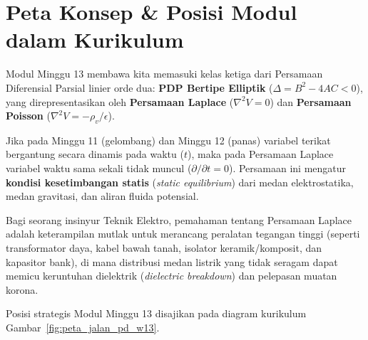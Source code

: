 \documentclass[11pt,a4paper]{article}
\theoremstyle{definition}
\begin{document}
\vspace{0.3cm}
\tableofcontents
\vspace{0.5cm}

\newpage

\section{Peta Konsep \& Posisi Modul dalam Kurikulum}

Modul Minggu 13 membawa kita memasuki kelas ketiga dari Persamaan Diferensial Parsial linier orde dua: \textbf{PDP Bertipe Elliptik} ($\Delta = B^2 - 4AC < 0$), yang direpresentasikan oleh \textbf{Persamaan Laplace} ($\nabla^2 V = 0$) dan \textbf{Persamaan Poisson} ($\nabla^2 V = -\rho_v/\epsilon$). 

Jika pada Minggu 11 (gelombang) dan Minggu 12 (panas) variabel terikat bergantung secara dinamis pada waktu ($t$), maka pada Persamaan Laplace variabel waktu sama sekali tidak muncul ($\partial/\partial t = 0$). Persamaan ini mengatur \textbf{kondisi kesetimbangan statis} (\textit{static equilibrium}) dari medan elektrostatika, medan gravitasi, dan aliran fluida potensial.

Bagi seorang insinyur Teknik Elektro, pemahaman tentang Persamaan Laplace adalah keterampilan mutlak untuk merancang peralatan tegangan tinggi (seperti transformator daya, kabel bawah tanah, isolator keramik/komposit, dan kapasitor bank), di mana distribusi medan listrik yang tidak seragam dapat memicu keruntuhan dielektrik (\textit{dielectric breakdown}) dan pelepasan muatan korona.

Posisi strategis Modul Minggu 13 disajikan pada diagram kurikulum Gambar~\ref{fig:peta_jalan_pd_w13}.
\end{document}
